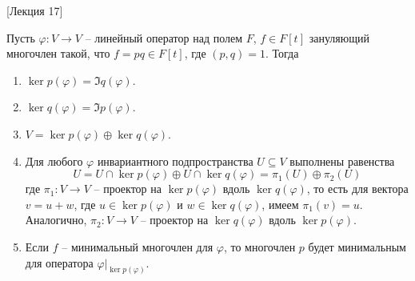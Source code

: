 [Лекция 17]


\begin{claim}\label{claim::IdealRootDec}
Пусть $\varphi\colon V\to V$ -- линейный оператор над полем $F$, $f\in F[t]$ зануляющий многочлен такой, что $f = p q \in F[t]$, где $(p, q) = 1$. Тогда
\begin{enumerate}
\item $\ker p(\varphi) = \Im q(\varphi)$.

\item $\ker q(\varphi) = \Im p(\varphi)$.

\item $V = \ker p(\varphi) \oplus \ker q(\varphi)$.

\item Для любого $\varphi$ инвариантного подпространства $U\subseteq V$ выполнены равенства
\[
U = U\cap \ker p(\varphi) \oplus U \cap \ker q(\varphi) = \pi_1(U)\oplus \pi_2(U)
\]
где $\pi_1 \colon V\to V$ -- проектор на $\ker p(\varphi)$ вдоль $\ker q(\varphi)$, то есть для вектора $v = u + w$, где $u\in \ker p(\varphi)$ и $w\in \ker q(\varphi)$, имеем $\pi_1(v) = u$. Аналогично, $\pi_2\colon V\to V$ -- проектор на $\ker q(\varphi)$ вдоль $\ker p(\varphi)$.

\item Если $f$ -- минимальный многочлен для $\varphi$, то  многочлен $p$ будет минимальным для оператора $\varphi|_{\ker p(\varphi)}$.

\end{enumerate}
\end{claim}
